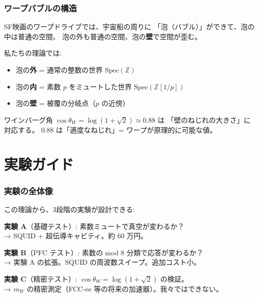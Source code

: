\documentclass[12pt,a4paper]{article}
\begin{document}
\section{ワープバブルの構造}

\begin{storybox}[ワープバブルの「壁」]
SF映画のワープドライブでは、宇宙船の周りに
「泡（バブル）」ができて、泡の中は普通の空間、
泡の外も普通の空間、泡の\textbf{壁}で空間が歪む。

私たちの理論では:
\begin{itemize}
\item 泡の\textbf{外} = 通常の整数の世界 $\mathrm{Spec}(\mathbb{Z})$
\item 泡の\textbf{内} = 素数 $p$ をミュートした世界 $\mathrm{Spec}(\mathbb{Z}[1/p])$
\item 泡の\textbf{壁} = 被覆の分岐点（$p$ の近傍）
\end{itemize}

ワインバーグ角 $\cos\theta_W = \log(1+\sqrt{2}) \approx 0.88$ は
「壁のねじれの大きさ」に対応する。
0.88 は「適度なねじれ」= ワープが原理的に可能な値。
\end{storybox}

\part{実験ガイド}

\section{実験の全体像}

\begin{expbox}[3つの実験]
この理論から、3段階の実験が設計できる:

\textbf{実験 A}（基礎テスト）: 素数ミュートで真空が変わるか？\\
→ SQUID + 超伝導キャビティ。約 60 万円。

\textbf{実験 B}（PFC テスト）: 素数の mod 8 分類で応答が変わるか？\\
→ 実験 A の拡張。SQUID の周波数スイープ。追加コスト小。

\textbf{実験 C}（精密テスト）: $\cos\theta_W = \log(1+\sqrt{2})$ の検証。\\
→ $m_W$ の精密測定（FCC-ee 等の将来の加速器）。我々ではできない。
\end{expbox}
\end{document}
